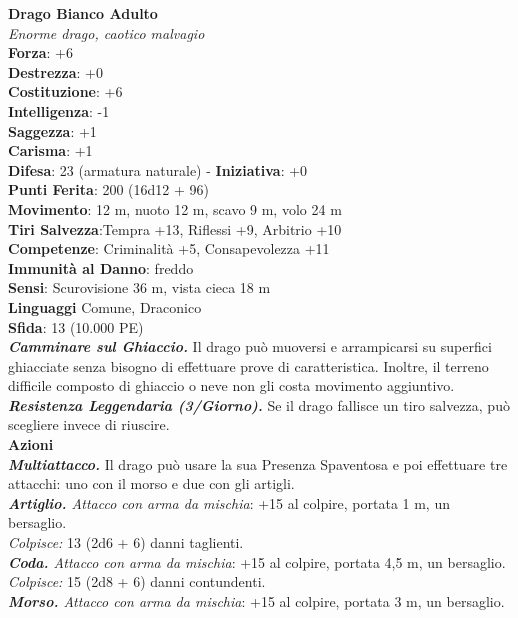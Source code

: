 \begin{multicols}{2}
\medskip\textbf{Drago Bianco Adulto}\\
\emph{Enorme drago, caotico malvagio}\\
\textbf{Forza}: +6\\
\textbf{Destrezza}: +0\\
\textbf{Costituzione}: +6\\
\textbf{Intelligenza}: -1\\
\textbf{Saggezza}: +1\\
\textbf{Carisma}: +1\\
\textbf{Difesa}: 23 (armatura naturale) - \textbf{Iniziativa}: +0\\
\textbf{Punti Ferita}: 200 (16d12 + 96)\\
\textbf{Movimento}: 12 m, nuoto 12 m, scavo 9 m, volo 24 m\\
\textbf{Tiri Salvezza}:Tempra +13, Riflessi +9, Arbitrio +10\\
\textbf{Competenze}: Criminalità +5, Consapevolezza +11\\
\textbf{Immunità al Danno}: freddo\\
\textbf{Sensi}: Scurovisione 36 m, vista cieca 18 m\\
\textbf{Linguaggi} Comune, Draconico\\
\textbf{Sfida}: 13 (10.000 PE)\smallskip\\
\emph{\textbf{Camminare sul Ghiaccio.}} Il drago può muoversi e arrampicarsi su superfici ghiacciate senza bisogno di effettuare prove di caratteristica. Inoltre, il terreno difficile composto di ghiaccio o neve non gli costa movimento aggiuntivo.\\
\emph{\textbf{Resistenza Leggendaria (3/Giorno).}} Se il drago fallisce un tiro salvezza, può scegliere invece di riuscire.\\
\smallskip\textbf{Azioni}\\
\emph{\textbf{Multiattacco.}} Il drago può usare la sua Presenza Spaventosa e poi effettuare tre attacchi: uno con il morso e due con gli artigli.\\
\emph{\textbf{Artiglio.} Attacco con arma da mischia}: +15 al colpire, portata 1 m, un bersaglio.\\
\emph{Colpisce:} 13 (2d6 + 6) danni taglienti.\\
\emph{\textbf{Coda.} Attacco con arma da mischia}: +15 al colpire, portata 4,5 m, un bersaglio.\\
\emph{Colpisce:} 15 (2d8 + 6) danni contundenti.\\
\emph{\textbf{Morso.} Attacco con arma da mischia}: +15 al colpire, portata 3 m, un bersaglio.\\

\end{multicols}
